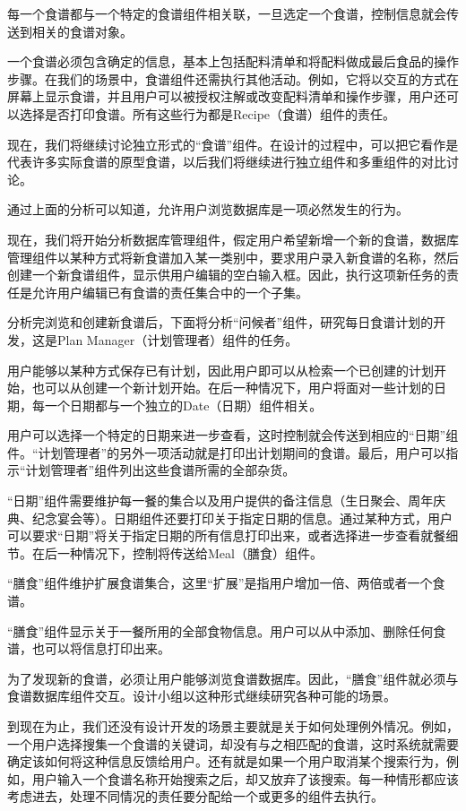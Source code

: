 每一个食谱都与一个特定的食谱组件相关联，一旦选定一个食谱，控制信息就会传送到相关的食谱对象。

一个食谱必须包含确定的信息，基本上包括配料清单和将配料做成最后食品的操作步骤。在我们的场景中，食谱组件还需执行其他活动。例如，它将以交互的方式在屏幕上显示食谱，并且用户可以被授权注解或改变配料清单和操作步骤，用户还可以选择是否打印食谱。所有这些行为都是Recipe（食谱）组件的责任。

现在，我们将继续讨论独立形式的“食谱”组件。在设计的过程中，可以把它看作是代表许多实际食谱的原型食谱，以后我们将继续进行独立组件和多重组件的对比讨论。

通过上面的分析可以知道，允许用户浏览数据库是一项必然发生的行为。

现在，我们将开始分析数据库管理组件，假定用户希望新增一个新的食谱，数据库管理组件以某种方式将新食谱加入某一类别中，要求用户录入新食谱的名称，然后创建一个新食谱组件，显示供用户编辑的空白输入框。因此，执行这项新任务的责任是允许用户编辑已有食谱的责任集合中的一个子集。

分析完浏览和创建新食谱后，下面将分析“问候者”组件，研究每日食谱计划的开发，这是Plan Manager（计划管理者）组件的任务。

用户能够以某种方式保存已有计划，因此用户即可以从检索一个已创建的计划开始，也可以从创建一个新计划开始。在后一种情况下，用户将面对一些计划的日期，每一个日期都与一个独立的Date（日期）组件相关。

用户可以选择一个特定的日期来进一步查看，这时控制就会传送到相应的“日期”组件。“计划管理者”的另外一项活动就是打印出计划期间的食谱。最后，用户可以指示“计划管理者”组件列出这些食谱所需的全部杂货。

“日期”组件需要维护每一餐的集合以及用户提供的备注信息（生日聚会、周年庆典、纪念宴会等）。日期组件还要打印关于指定日期的信息。通过某种方式，用户可以要求“日期”将关于指定日期的所有信息打印出来，或者选择进一步查看就餐细节。在后一种情况下，控制将传送给Meal（膳食）组件。

\begin{compactitem}
\item “膳食”组件维护扩展食谱集合，这里“扩展”是指用户增加一倍、两倍或者一个食谱。
\item “膳食”组件显示关于一餐所用的全部食物信息。用户可以从中添加、删除任何食谱，也可以将信息打印出来。
\end{compactitem}

为了发现新的食谱，必须让用户能够浏览食谱数据库。因此，“膳食”组件就必须与食谱数据库组件交互。设计小组以这种形式继续研究各种可能的场景。

到现在为止，我们还没有设计开发的场景主要就是关于如何处理例外情况。例如，一个用户选择搜集一个食谱的关键词，却没有与之相匹配的食谱，这时系统就需要确定该如何将这种信息反馈给用户。还有就是如果一个用户取消某个搜索行为，例如，用户输入一个食谱名称开始搜索之后，却又放弃了该搜索。每一种情形都应该考虑进去，处理不同情况的责任要分配给一个或更多的组件去执行。

